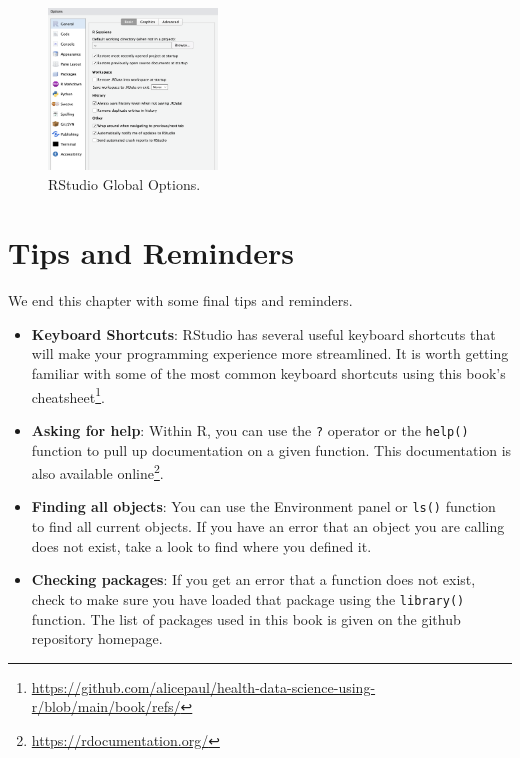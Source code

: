 \documentclass[
  letterpaper,
]{krantz}
\renewcommand{\href}[2]{#2\footnote{\url{#1}}}
\begin{document}
\begin{figure}

{\centering \includegraphics[width=0.4\textwidth,height=\textheight]{book/images/1-rstudio-global-opts.png}

}

\caption{\label{fig-global-options}RStudio Global Options.}

\end{figure}

\hypertarget{tips-and-reminders}{%
\section{Tips and Reminders}\label{tips-and-reminders}}

We end this chapter with some final tips and reminders.

\begin{itemize}
\item
  \textbf{Keyboard Shortcuts}: RStudio has several useful keyboard
  shortcuts that will make your programming experience more streamlined.
  It is worth getting familiar with some of the most common keyboard
  shortcuts using this book's
  \href{https://github.com/alicepaul/health-data-science-using-r/blob/main/book/refs/}{cheatsheet}.
\item
  \textbf{Asking for help}: Within R, you can use the \texttt{?}
  operator or the \texttt{help()} function to pull up documentation on a
  given function. This documentation is also available
  \href{https://rdocumentation.org/}{online}.
\item
  \textbf{Finding all objects}: You can use the Environment panel or
  \texttt{ls()} function to find all current objects. If you have an
  error that an object you are calling does not exist, take a look to
  find where you defined it.
\item
  \textbf{Checking packages}: If you get an error that a function does
  not exist, check to make sure you have loaded that package using the
  \texttt{library()} function. The list of packages used in this book is
  given on the github repository homepage.
\end{itemize}
\end{document}
